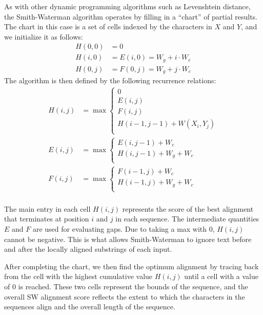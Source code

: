 \documentclass[pdftex,11pt]{article}
\begin{document}
As with other dynamic programming algorithms such as Levenshtein
distance, the Smith-Waterman algorithm operates by filling in a
``chart'' of partial results.  The chart in this case is a set of
cells indexed by the characters in $X$ and $Y$, and we initialize it
as follows:
\begin{align*}
  H(0, 0) & = 0 \\
  H(i, 0) & = E(i, 0) = W_g + i \cdot W_c \\
  H(0, j) & = F(0, j) = W_g + j \cdot W_c
\end{align*}
\noindent The algorithm is then defined by the following recurrence
relations:
\begin{align*}
  H(i, j) & = \max\left\{
    \begin{array}{l}
      0 \\
      E(i, j) \\
      F(i, j) \\
      H(i - 1, j - 1) + W(X_i, Y_j) \\
    \end{array} \right. \\
  E(i, j) & = \max \left\{
    \begin{array}{l}
      E(i, j - 1) + W_c \\
      H(i, j - 1) + W_g + W_c \\
    \end{array} \right. \\
  F(i, j) & = \max \left\{
    \begin{array}{l}
      F(i - 1, j) + W_c \\
      H(i - 1, j) + W_g + W_c \\
    \end{array} \right. \\
\end{align*}

\noindent The main entry in each cell $H(i,j)$ represents the score of
the best alignment that terminates at position $i$ and $j$ in each
sequence.  The intermediate quantities $E$ and $F$ are used for
evaluating gaps.  Due to taking a max with 0, $H(i,j)$ cannot be
negative.  This is what allows Smith-Waterman to ignore text before
and after the locally aligned substrings of each input.

After completing the chart, we then find the optimum alignment by
tracing back from the cell with the highest cumulative value $H(i, j)$
until a cell with a value of 0 is reached. These two cells represent
the bounds of the sequence, and the overall SW alignment score
reflects the extent to which the characters in the sequences align and
the overall length of the sequence.
\end{document}
